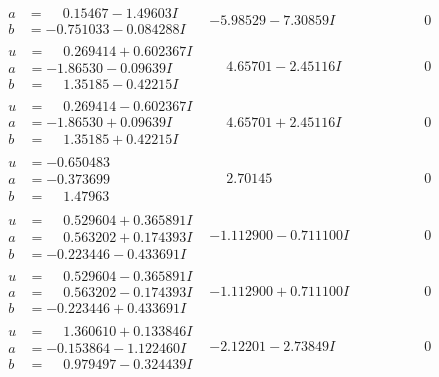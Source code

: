 \documentclass[1p]{elsarticle_modified}
\theoremstyle{definition}
\begin{document}
$$\begin{array}{c|c|c}
\begin{aligned}
a &= \phantom{-}0.15467 - 1.49603 I \\
b &= -0.751033 - 0.084288 I\end{aligned}
 & -5.98529 - 7.30859 I & \phantom{-0.000000 } 0 \\ \hline\begin{aligned}
u &= \phantom{-}0.269414 + 0.602367 I \\
a &= -1.86530 - 0.09639 I \\
b &= \phantom{-}1.35185 - 0.42215 I\end{aligned}
 & \phantom{-}4.65701 - 2.45116 I & \phantom{-0.000000 } 0 \\ \hline\begin{aligned}
u &= \phantom{-}0.269414 - 0.602367 I \\
a &= -1.86530 + 0.09639 I \\
b &= \phantom{-}1.35185 + 0.42215 I\end{aligned}
 & \phantom{-}4.65701 + 2.45116 I & \phantom{-0.000000 } 0 \\ \hline\begin{aligned}
u &= -0.650483\phantom{ +0.000000I} \\
a &= -0.373699\phantom{ +0.000000I} \\
b &= \phantom{-}1.47963\phantom{ +0.000000I}\end{aligned}
 & \phantom{-}2.70145\phantom{ +0.000000I} & \phantom{-0.000000 } 0 \\ \hline\begin{aligned}
u &= \phantom{-}0.529604 + 0.365891 I \\
a &= \phantom{-}0.563202 + 0.174393 I \\
b &= -0.223446 - 0.433691 I\end{aligned}
 & -1.112900 - 0.711100 I & \phantom{-0.000000 } 0 \\ \hline\begin{aligned}
u &= \phantom{-}0.529604 - 0.365891 I \\
a &= \phantom{-}0.563202 - 0.174393 I \\
b &= -0.223446 + 0.433691 I\end{aligned}
 & -1.112900 + 0.711100 I & \phantom{-0.000000 } 0 \\ \hline\begin{aligned}
u &= \phantom{-}1.360610 + 0.133846 I \\
a &= -0.153864 - 1.122460 I \\
b &= \phantom{-}0.979497 - 0.324439 I\end{aligned}
 & -2.12201 - 2.73849 I & \phantom{-0.000000 } 0\\

\end{array}$$
\end{document}
